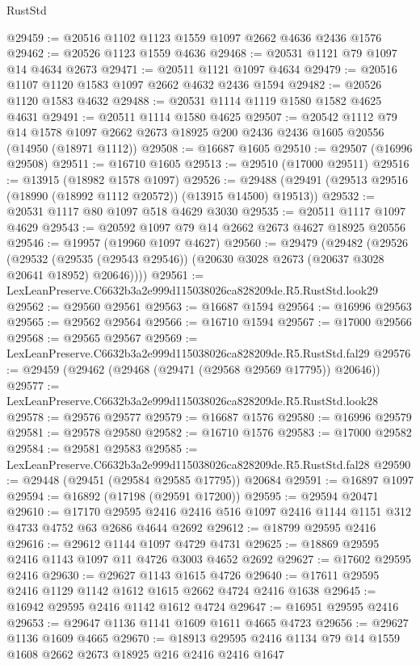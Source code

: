 \begin{lexlean}{RustStd}
\begin{coremodule}
@29459 := @20516 @1102 @1123 @1559 @1097 @2662 @4636 @2436 @1576
@29462 := @20526 @1123 @1559 @4636
@29468 := @20531 @1121 @79 @1097 @14 @4634 @2673
@29471 := @20511 @1121 @1097 @4634
@29479 := @20516 @1107 @1120 @1583 @1097 @2662 @4632 @2436 @1594
@29482 := @20526 @1120 @1583 @4632
@29488 := @20531 @1114 @1119 @1580 @1582 @4625 @4631
@29491 := @20511 @1114 @1580 @4625
@29507 := @20542
    @1112
    @79
    @14
    @1578
    @1097
    @2662
    @2673
    @18925
    @200
    @2436
    @2436
    @1605
    @20556
    (@14950 (@18971 @1112))
@29508 := @16687 @1605
@29510 := @29507 (@16996 @29508)
@29511 := @16710 @1605
@29513 := @29510 (@17000 @29511)
@29516 := @13915 (@18982 @1578 @1097)
@29526 := @29488 (@29491 (@29513 @29516 (@18990 (@18992 @1112 @20572)) (@13915 @14500) @19513))
@29532 := @20531 @1117 @80 @1097 @518 @4629 @3030
@29535 := @20511 @1117 @1097 @4629
@29543 := @20592 @1097 @79 @14 @2662 @2673 @4627 @18925 @20556
@29546 := @19957 (@19960 @1097 @4627)
@29560 := @29479
    (@29482
      (@29526
        (@29532 (@29535 (@29543 @29546)) (@20630 @3028 @2673 (@20637 @3028 @20641 @18952) @20646))))
@29561 := LexLeanPreserve.C6632b3a2e999d115038026ca828209de.R5.RustStd.look29
@29562 := @29560 @29561
@29563 := @16687 @1594
@29564 := @16996 @29563
@29565 := @29562 @29564
@29566 := @16710 @1594
@29567 := @17000 @29566
@29568 := @29565 @29567
@29569 := LexLeanPreserve.C6632b3a2e999d115038026ca828209de.R5.RustStd.fal29
@29576 := @29459 (@29462 (@29468 (@29471 (@29568 @29569 @17795)) @20646))
@29577 := LexLeanPreserve.C6632b3a2e999d115038026ca828209de.R5.RustStd.look28
@29578 := @29576 @29577
@29579 := @16687 @1576
@29580 := @16996 @29579
@29581 := @29578 @29580
@29582 := @16710 @1576
@29583 := @17000 @29582
@29584 := @29581 @29583
@29585 := LexLeanPreserve.C6632b3a2e999d115038026ca828209de.R5.RustStd.fal28
@29590 := @29448 (@29451 (@29584 @29585 @17795)) @20684
@29591 := @16897 @1097
@29594 := @16892 (@17198 (@29591 @17200))
@29595 := @29594 @20471
@29610 := @17170
    @29595
    @2416
    @2416
    @516
    @1097
    @2416
    @1144
    @1151
    @312
    @4733
    @4752
    @63
    @2686
    @4644
    @2692
@29612 := @18799 @29595 @2416
@29616 := @29612 @1144 @1097 @4729 @4731
@29625 := @18869 @29595 @2416 @1143 @1097 @11 @4726 @3003 @4652 @2692
@29627 := @17602 @29595 @2416
@29630 := @29627 @1143 @1615 @4726
@29640 := @17611 @29595 @2416 @1129 @1142 @1612 @1615 @2662 @4724 @2416 @1638
@29645 := @16942 @29595 @2416 @1142 @1612 @4724
@29647 := @16951 @29595 @2416
@29653 := @29647 @1136 @1141 @1609 @1611 @4665 @4723
@29656 := @29627 @1136 @1609 @4665
@29670 := @18913 @29595 @2416 @1134 @79 @14 @1559 @1608 @2662 @2673 @18925 @216 @2416 @2416 @1647

\end{coremodule}
\end{lexlean}
